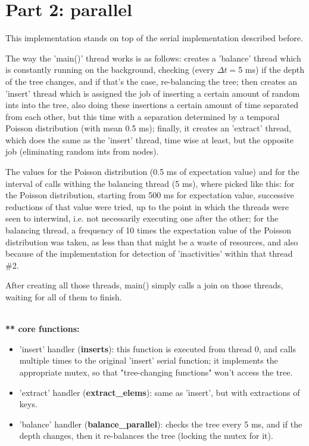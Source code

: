 \documentclass[paper=a4, fontsize=11pt]{scrartcl} %
\numberwithin{equation}{section} %
\numberwithin{figure}{section} %
\numberwithin{table}{section} %
\begin{document}
\newpage

\section{Part 2: parallel}

This implementation stands on top of the serial implementation described before.

The way the 'main()' thread works is as follows: creates a 'balance' thread which is constantly running on the background, checking (every $\Delta t = $5 ms) if the depth of the tree changes, and if that's the case, re-balancing the tree; then creates an 'insert' thread which is assigned the job of inserting a certain amount of random ints into the tree, also doing these insertions a certain amount of time separated from each other, but this time with a separation determined by a temporal Poisson distribution (with mean 0.5 ms); finally, it creates an 'extract' thread, which does the same as the 'insert' thread, time wise at least, but the opposite job (eliminating random ints from nodes).

The values for the Poisson distribution (0.5 ms of expectation value) and for the interval of calls withing the balancing thread (5 ms), where picked like this: for the Poisson distribution, starting from 500 ms for expectation value, successive reductions of that value were tried, up to the point in which the threads were seen to interwind, i.e. not necessarily executing one after the other; for the balancing thread, a frequency of 10 times the expectation value of the Poisson distribution was taken, as less than that might be a waste of resources, and also because of the implementation for detection of 'inactivities' within that thread \#2.

After creating all those threads, main() simply calls a join on those threads, waiting for all of them to finish.

\ \\


\textbf{** core functions:}

\begin{itemize}
\item 'insert' handler (\textbf{inserts}): this function is executed from thread 0, and calls multiple times to the original 'insert' serial function; it implements the appropriate mutex, so that "tree-changing functions" won't access the tree.
\item 'extract' handler (\textbf{extract\_elems}): same as 'insert', but with extractions of keys.
\item 'balance' handler (\textbf{balance\_parallel}): checks the tree every 5 ms, and if the depth changes, then it re-balances the tree (locking the mutex for it).
\end{itemize}
\end{document}
